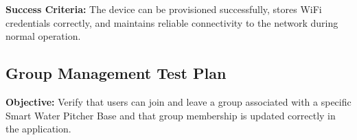 \noindent{}\textbf{Success Criteria:}
The device can be provisioned successfully, stores WiFi credentials correctly, and maintains
reliable connectivity to the network during normal operation.


\subsection*{Group Management Test Plan}

\noindent{}\textbf{Objective:}
Verify that users can join and leave a group associated with a specific Smart Water Pitcher Base and that group membership is updated correctly in the application.\\

